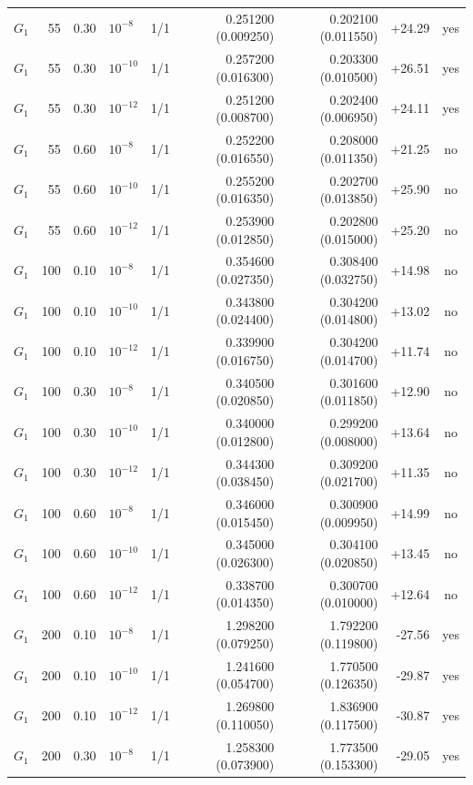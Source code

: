 \begin{longtable}{lrrlrrrrc}
$G_1$ & 55 & 0.30 & $10^{-8}$ & 1/1 & 0.251200 (0.009250) & 0.202100 (0.011550) & +24.29 & yes\\
$G_1$ & 55 & 0.30 & $10^{-10}$ & 1/1 & 0.257200 (0.016300) & 0.203300 (0.010500) & +26.51 & yes\\
$G_1$ & 55 & 0.30 & $10^{-12}$ & 1/1 & 0.251200 (0.008700) & 0.202400 (0.006950) & +24.11 & yes\\
$G_1$ & 55 & 0.60 & $10^{-8}$ & 1/1 & 0.252200 (0.016550) & 0.208000 (0.011350) & +21.25 & no\\
$G_1$ & 55 & 0.60 & $10^{-10}$ & 1/1 & 0.255200 (0.016350) & 0.202700 (0.013850) & +25.90 & no\\
$G_1$ & 55 & 0.60 & $10^{-12}$ & 1/1 & 0.253900 (0.012850) & 0.202800 (0.015000) & +25.20 & no\\
$G_1$ & 100 & 0.10 & $10^{-8}$ & 1/1 & 0.354600 (0.027350) & 0.308400 (0.032750) & +14.98 & no\\
$G_1$ & 100 & 0.10 & $10^{-10}$ & 1/1 & 0.343800 (0.024400) & 0.304200 (0.014800) & +13.02 & no\\
$G_1$ & 100 & 0.10 & $10^{-12}$ & 1/1 & 0.339900 (0.016750) & 0.304200 (0.014700) & +11.74 & no\\
$G_1$ & 100 & 0.30 & $10^{-8}$ & 1/1 & 0.340500 (0.020850) & 0.301600 (0.011850) & +12.90 & no\\
$G_1$ & 100 & 0.30 & $10^{-10}$ & 1/1 & 0.340000 (0.012800) & 0.299200 (0.008000) & +13.64 & no\\
$G_1$ & 100 & 0.30 & $10^{-12}$ & 1/1 & 0.344300 (0.038450) & 0.309200 (0.021700) & +11.35 & no\\
$G_1$ & 100 & 0.60 & $10^{-8}$ & 1/1 & 0.346000 (0.015450) & 0.300900 (0.009950) & +14.99 & no\\
$G_1$ & 100 & 0.60 & $10^{-10}$ & 1/1 & 0.345000 (0.026300) & 0.304100 (0.020850) & +13.45 & no\\
$G_1$ & 100 & 0.60 & $10^{-12}$ & 1/1 & 0.338700 (0.014350) & 0.300700 (0.010000) & +12.64 & no\\
$G_1$ & 200 & 0.10 & $10^{-8}$ & 1/1 & 1.298200 (0.079250) & 1.792200 (0.119800) & -27.56 & yes\\
$G_1$ & 200 & 0.10 & $10^{-10}$ & 1/1 & 1.241600 (0.054700) & 1.770500 (0.126350) & -29.87 & yes\\
$G_1$ & 200 & 0.10 & $10^{-12}$ & 1/1 & 1.269800 (0.110050) & 1.836900 (0.117500) & -30.87 & yes\\
$G_1$ & 200 & 0.30 & $10^{-8}$ & 1/1 & 1.258300 (0.073900) & 1.773500 (0.153300) & -29.05 & yes\\

\end{longtable}
